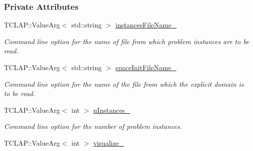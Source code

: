 \subsubsection*{Private Attributes}
\begin{DoxyCompactItemize}
\item 
T\+C\+L\+A\+P\+::\+Value\+Arg$<$ std\+::string $>$ \hyperlink{structcommandLine_1_1CommandLine_a3511c83f68e09cd79d790514fb53752d}{instances\+File\+Name\+\_\+}\hypertarget{structcommandLine_1_1CommandLine_a3511c83f68e09cd79d790514fb53752d}{}\label{structcommandLine_1_1CommandLine_a3511c83f68e09cd79d790514fb53752d}

\begin{DoxyCompactList}\small\item\em Command line option for the name of file from which problem instances are to be read. \end{DoxyCompactList}\item 
T\+C\+L\+A\+P\+::\+Value\+Arg$<$ std\+::string $>$ \hyperlink{structcommandLine_1_1CommandLine_ae1f1b02dbfea0f215be7993f11b7caa9}{space\+Init\+File\+Name\+\_\+}\hypertarget{structcommandLine_1_1CommandLine_ae1f1b02dbfea0f215be7993f11b7caa9}{}\label{structcommandLine_1_1CommandLine_ae1f1b02dbfea0f215be7993f11b7caa9}

\begin{DoxyCompactList}\small\item\em Command line option for the name of the file from which the explicit domain is to be read. \end{DoxyCompactList}\item 
T\+C\+L\+A\+P\+::\+Value\+Arg$<$ int $>$ \hyperlink{structcommandLine_1_1CommandLine_ad0482746d8d1f171cfc9c976bdf0f91d}{n\+Instances\+\_\+}\hypertarget{structcommandLine_1_1CommandLine_ad0482746d8d1f171cfc9c976bdf0f91d}{}\label{structcommandLine_1_1CommandLine_ad0482746d8d1f171cfc9c976bdf0f91d}

\begin{DoxyCompactList}\small\item\em Command line option for the number of problem instances. \end{DoxyCompactList}\item 
T\+C\+L\+A\+P\+::\+Value\+Arg$<$ int $>$ \hyperlink{structcommandLine_1_1CommandLine_a14a4ae8416614d83e92aa8263118e584}{visualize\+\_\+}\hypertarget{structcommandLine_1_1CommandLine_a14a4ae8416614d83e92aa8263118e584}{}\label{structcommandLine_1_1CommandLine_a14a4ae8416614d83e92aa8263118e584}


\end{DoxyCompactItemize}
